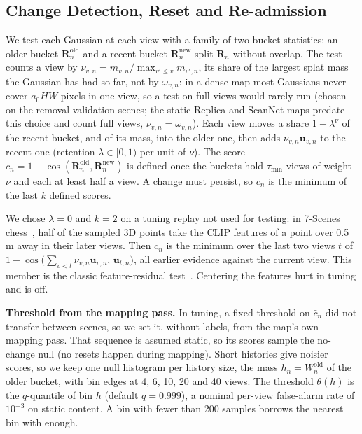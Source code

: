 \documentclass[journal]{IEEEtran}
\newcommand{\R}{\mathbf{R}}
\begin{document}
\subsection{Change Detection, Reset and Re-admission}
\label{sec:change}
We test each Gaussian at each view with a family of two-bucket statistics: an older bucket $\R^{\mathrm{old}}_n$ and a recent bucket $\R^{\mathrm{new}}_n$ split $\R_n$ without overlap. The test counts a view by $\nu_{v,n}=m_{v,n}/\max_{v'\le v}m_{v',n}$, its share of the largest splat mass the Gaussian has had so far, not by $\omega_{v,n}$: in a dense map most Gaussians never cover $a_0HW$ pixels in one view, so a test on full views would rarely run (chosen on the removal validation scenes; the static Replica and ScanNet maps predate this choice and count full views, $\nu_{v,n}=\omega_{v,n}$). Each view moves a share $1-\lambda^{\nu}$ of the recent bucket, and of its mass, into the older one, then adds $\nu_{v,n}\mathbf{u}_{v,n}$ to the recent one (retention $\lambda\in[0,1)$ per unit of $\nu$). The score $c_n=1-\cos(\R^{\mathrm{old}}_n,\R^{\mathrm{new}}_n)$ is defined once the buckets hold $\tau_{\min}$ views of weight $\nu$ and each at least half a view. A change must persist, so $\bar c_n$ is the minimum of the last $k$ defined scores.

We chose $\lambda=0$ and $k=2$ on a tuning replay not used for testing: in 7-Scenes chess~\cite{glocker2013}, half of the sampled 3D points take the CLIP features of a point over 0.5\,m away in their later views. Then $\bar c_n$ is the minimum over the last two views $t$ of $1-\cos\big(\sum_{v<t}\nu_{v,n}\mathbf{u}_{v,n},\,\mathbf{u}_{t,n}\big)$, all earlier evidence against the current view. This member is the classic feature-residual test~\cite{jiang2026mif, ackermann2025clsplats}. Centering the features hurt in tuning and is off.

\textbf{Threshold from the mapping pass.} In tuning, a fixed threshold on $\bar c_n$ did not transfer between scenes, so we set it, without labels, from the map's own mapping pass. That sequence is assumed static, so its scores sample the no-change null (no resets happen during mapping). Short histories give noisier scores, so we keep one null histogram per history size, the mass $h_n=W^{\mathrm{old}}_n$ of the older bucket, with bin edges at 4, 6, 10, 20 and 40 views. The threshold $\theta(h)$ is the $q$-quantile of bin $h$ (default $q=0.999$), a nominal per-view false-alarm rate of $10^{-3}$ on static content. A bin with fewer than 200 samples borrows the nearest bin with enough.
\end{document}

